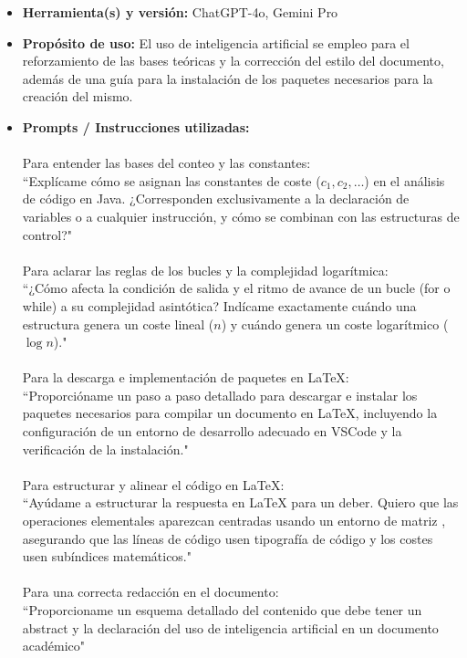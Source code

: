 \documentclass[pdflatex,sn-mathphys-num]{sn-jnl}%
\theoremstyle{thmstyleone}%
\theoremstyle{thmstyletwo}%
\theoremstyle{thmstylethree}%
\begin{document}
\begin{itemize}
\item \textbf{Herramienta(s) y versión:} 
ChatGPT-4o, Gemini Pro \\
\item \textbf{Propósito de uso:} 
El uso de inteligencia artificial se empleo para el reforzamiento de las bases teóricas y la corrección del estilo del documento, además de una guía para la instalación de los paquetes necesarios para la creación del mismo. \\
\item \textbf{Prompts / Instrucciones utilizadas:} \\
\\
Para entender las bases del conteo y las constantes: \\
``Explícame cómo se asignan las constantes de coste ($c_1, c_2, \dots$) en el análisis de código en Java. ¿Corresponden exclusivamente a la declaración de variables o a cualquier instrucción, y cómo se combinan con las estructuras de control?" \\
\\
Para aclarar las reglas de los bucles y la complejidad logarítmica:\\
``¿Cómo afecta la condición de salida y el ritmo de avance de un bucle (for o while) a su complejidad asintótica? Indícame exactamente cuándo una estructura genera un coste lineal ($n$) y cuándo genera un coste logarítmico ($\log n$)." \\
\\
Para la descarga e implementación de paquetes en LaTeX:\\
``Proporcióname un paso a paso detallado para descargar e instalar los paquetes necesarios para compilar un documento en LaTeX, incluyendo la configuración de un entorno de desarrollo adecuado en VSCode y la verificación de la instalación." \\
\\
Para estructurar y alinear el código en LaTeX: \\
``Ayúdame a estructurar la respuesta en LaTeX para un deber. Quiero que las operaciones elementales aparezcan centradas usando un entorno de matriz , asegurando que las líneas de código usen tipografía de código y los costes usen subíndices matemáticos." \\
\\
Para una correcta redacción en el documento: \\
``Proporcioname un esquema detallado del contenido que debe tener un abstract y la declaración del uso de inteligencia artificial en un documento académico"

\end{itemize}
\end{document}
